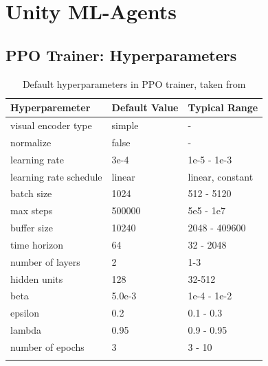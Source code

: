 
\section{Unity ML-Agents}\label{appendix:mlagents}


\subsection{PPO Trainer: Hyperparameters}\label{appendix:ppo-trainer}

\begin{longtable}{@{} p{3.5cm} p{2.5cm} p{2.5cm} @{}} \toprule
\textbf{Hyperparemeter}       & \textbf{Default Value} & \textbf{Typical Range} \\ \midrule
visual encoder type         & simple    & - \\ 
normalize                   & false     & - \\
learning rate               & 3e-4      & 1e-5 - 1e-3 \\ 
learning rate schedule      & linear    & linear, constant \\ 
batch size                  &  1024     & 512 - 5120 \\
max steps                   &  500000   & 5e5 - 1e7 \\ 
buffer size                 & 10240     & 2048 - 409600 \\ 
time horizon                &  64       & 32 - 2048  \\
number of layers            &  2        & 1-3 \\
hidden units                &  128      & 32-512 \\
beta                        &  5.0e-3   & 1e-4 - 1e-2  \\
epsilon                     &  0.2      & 0.1 - 0.3  \\
lambda                      &  0.95     & 0.9 - 0.95  \\
number of epochs            & 3         & 3 - 10 \\ \bottomrule
\caption{Default hyperparameters in PPO trainer, taken from \cite{github-unity-mlagents-toolkit}} \label{tab:default-hyperparameters}
\end{longtable}

